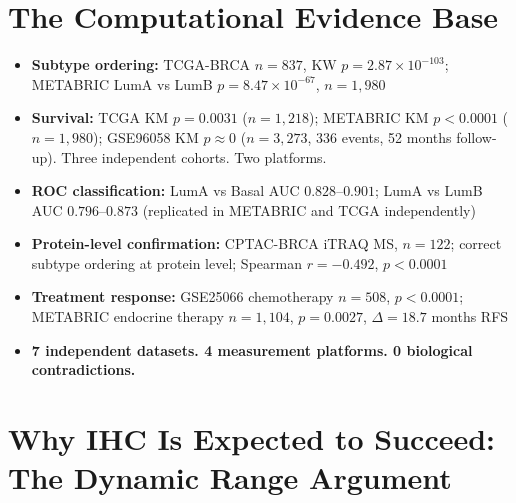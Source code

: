 \documentclass[11pt, a4paper]{article}
\begin{document}
\section{The Computational Evidence Base}

\begin{mdframed}[backgroundcolor=statsbox,
                 linecolor=purple!40!black,
                 linewidth=1pt]
\begin{itemize}[noitemsep]
    \item \textbf{Subtype ordering:}
    TCGA-BRCA $n=837$,
    KW $p=2.87\times10^{-103}$;
    METABRIC LumA vs LumB
    $p=8.47\times10^{-67}$, $n=1{,}980$
    \item \textbf{Survival:} TCGA KM
    $p=0.0031$ ($n=1{,}218$); METABRIC
    KM $p<0.0001$ ($n=1{,}980$);
    GSE96058 KM $p\approx0$ ($n=3{,}273$,
    336 events, 52 months follow-up).
    Three independent cohorts. Two platforms.
    \item \textbf{ROC classification:}
    LumA vs Basal AUC $0.828$--$0.901$;
    LumA vs LumB AUC $0.796$--$0.873$
    (replicated in METABRIC and TCGA
    independently)
    \item \textbf{Protein-level confirmation:}
    CPTAC-BRCA iTRAQ MS, $n=122$;
    correct subtype ordering at protein level;
    Spearman $r=-0.492$, $p<0.0001$
    \item \textbf{Treatment response:}
    GSE25066 chemotherapy $n=508$,
    $p<0.0001$; METABRIC endocrine therapy
    $n=1{,}104$, $p=0.0027$,
    $\Delta=18.7$ months RFS
    \item \textbf{7 independent datasets.
    4 measurement platforms.
    0 biological contradictions.}
\end{itemize}
\end{mdframed}

\section{Why IHC Is Expected to Succeed:
The Dynamic Range Argument}
\end{document}
